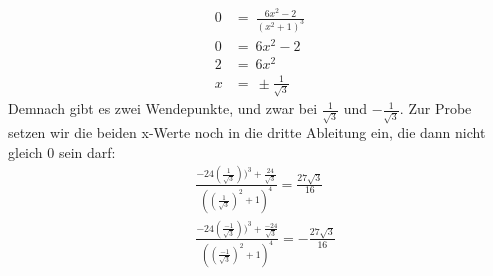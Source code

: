 \documentclass[a4paper,11pt]{article}
\begin{document}
\begin{enumerate}
\begin{enumerate}
\begin{align*}
                    0 &=\ \frac{6x^2-2}{(x^2+1)^3}\\
                    0 &=\ 6x^2-2\\
                    2 &=\ 6x^2\\
                    x &=\ \pm \frac{1}{\sqrt{3}}
                \end{align*}
                Demnach gibt es zwei Wendepunkte, und zwar bei $\frac{1}{\sqrt{3}}$ und $-\frac{1}{\sqrt{3}}$.
                Zur Probe setzen wir die beiden x-Werte noch in die dritte Ableitung ein, die dann nicht gleich 0 sein darf:
                \begin{align*}
                    &\frac{-24(\frac{1}{\sqrt{3}}))^3+\frac{24}{\sqrt{3}}}{((\frac{1}{\sqrt{3}})^2+1)^4} = \frac{27 \sqrt{3}}{16}\\[0.5cm]
                    &\frac{-24(\frac{-1}{\sqrt{3}}))^3+\frac{-24}{\sqrt{3}}}{((\frac{-1}{\sqrt{3}})^2+1)^4} = -\frac{27 \sqrt{3}}{16}
                \end{align*}
            \end{enumerate}

    \end{enumerate}
\end{document}
